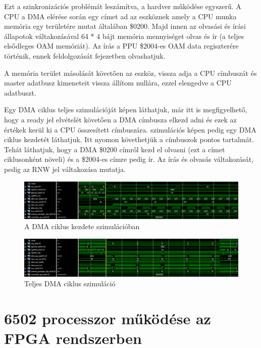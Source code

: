 Ezt a szinkronizációs problémát leszámítva, a hardver működése egyszerű. A CPU a DMA elérése során egy címet ad az eszköznek amely a CPU munka memória egy területére mutat általában \$0200. Majd innen az olvasási és írási állapotok váltakozásával 64 * 4 bájt memória mennyiséget olvas és ír (a teljes elsődleges OAM memóriát). Az írás a PPU \$2004-es OAM data regiszterére történik, ennek feldolgozását  fejezetben olvashatjuk.

A memória terület másolását követően az eszköz, vissza adja a CPU címbuszát és master adatbusz kimeneteit vissza állítom nullára, ezzel elengedve a CPU adatbuszt.

Egy DMA ciklus teljes szimulációját  képen láthatjuk, már itt is megfigyelhető, hogy a ready jel elvételét követően a DMA címbusza elkezd adni és ezek az értékek kerül ki a CPU összesített címbuszára.  szimulációs képen pedig egy DMA ciklus kezdetét láthatjuk. Itt nyomon követhetjük a címbuszok pontos tartalmát. Tehát láthatjuk, hogy a DMA \$0200 címről kezd el olvasni (ezt a címet ciklusonként növeli) és a \$2004-es címre pedig ír. Az írás és olvasás váltakozását, pedig az RNW jel váltakozása mutatja. 

\begin{figure}[H]
	\centering
	\includegraphics[width=150mm, keepaspectratio]{figures/Working-dma-in-simulation}
	\caption{A DMA ciklus kezdete szimulációban} 
	\label{fig:Working-dma-in-simulation}
\end{figure} 

\begin{figure}[H]
	\centering
	\includegraphics[width=150mm, keepaspectratio]{figures/Full-dma-working-in-simulation}
	\caption{Teljes DMA ciklus szimuláció} 
	\label{fig:Full-dma-working-in-simulation}
\end{figure} 

\section{6502 processzor működése az FPGA rendszerben}

